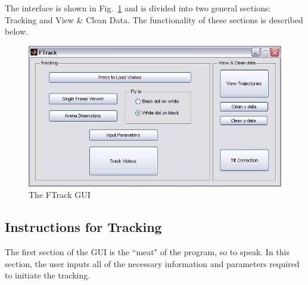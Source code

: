 \documentclass[letterpaper, 11pt]{article}
\begin{document}
The interface is shown in Fig.\ \ref{GUI} and is divided into two general sections: Tracking and
View \& Clean Data.  The functionality of these sections is described below.

\begin{figure}
    \centering
    \hspace{-0cm}
    \includegraphics[bb= 0.0 0.0 613.0 341.0 clip=true, scale = 0.7]{GUI.jpg}
    \caption{The FTrack GUI}
    \label{GUI}
\end{figure}


\subsection*{Instructions for Tracking}
The first section of the GUI is the ``meat" of the program, so to speak.  In this section, the user
inputs all of the necessary information and parameters required to initiate the tracking.
\end{document}
